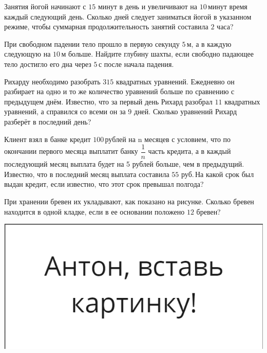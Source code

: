 \begin{class}[number=4]
\begin{listofex}
	\item Занятия йогой начинают с \( 15 \) минут в день и увеличивают на \( 10 \) минут время каждый следующий день. Сколько дней следует заниматься йогой в указанном режиме, чтобы суммарная продолжительность занятий составила \( 2 \) часа?
	
	\item При свободном падении тело прошло в первую секунду \( 5 \) м, а в каждую следующую на \( 10 \) м больше. Найдите глубину шахты, если свободно падающее тело достигло его дна через \( 5 \) с после начала падения.
	
	\item Рихарду необходимо разобрать \( 315 \) квадратных уравнений. Ежедневно он разбирает на одно и то же количество уравнений больше по сравнению с предыдущем днём. Известно, что за первый день Рихард разобрал \( 11 \) квадратных уравнений, а справился со всеми он за \( 9 \) дней. Сколько уравнений Рихард разберёт в последний день?
	
	\item Клиент взял в банке кредит \( 100 \) рублей на n месяцев с условием, что по окончании первого месяца выплатит банку \( \dfrac{1}{n} \) часть кредита, а в каждый последующий месяц выплата будет на 5 рублей больше, чем в предыдущий. Известно, что в последний месяц выплата составила \( 55 \) руб. На какой срок был выдан кредит, если известно, что этот срок превышал полгода?
	
	\item 
	\begin{minipage}[t]{0.57\textwidth}
		При хранении бревен их укладывают, как показано на рисунке. Сколько бревен находится в одной кладке, если в ее основании положено \( 12 \) бревен?
	\end{minipage}
	\begin{minipage}[c]{0.3\textwidth}
		\includegraphics[align=t, width=\textwidth]{pics/G91M4L4-1}
	\end{minipage}
	

\end{listofex}
\end{class}
